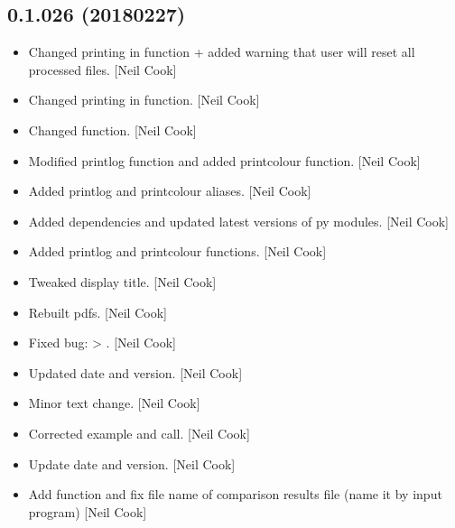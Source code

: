 \documentclass[a4paper,10pt,english]{report}
\begin{document}
\subsection{0.1.026 (2018\sphinxhyphen{}02\sphinxhyphen{}27)}
\label{\detokenize{misc/changelog:id497}}\begin{itemize}
\item {} 
Changed printing in function + added warning that user will reset all
processed files. {[}Neil Cook{]}

\item {} 
Changed printing in function. {[}Neil Cook{]}

\item {} 
Changed  function. {[}Neil Cook{]}

\item {} 
Modified printlog function and added printcolour function. {[}Neil Cook{]}

\item {} 
Added printlog and printcolour aliases. {[}Neil Cook{]}

\item {} 
Added dependencies and updated latest versions of py modules. {[}Neil
Cook{]}

\item {} 
Added printlog and printcolour functions. {[}Neil Cook{]}

\item {} 
Tweaked display title. {[}Neil Cook{]}

\item {} 
Rebuilt pdfs. {[}Neil Cook{]}

\item {} 
Fixed bug:  \sphinxhyphen{}\textgreater{} . {[}Neil Cook{]}

\item {} 
Updated date and version. {[}Neil Cook{]}

\item {} 
Minor text change. {[}Neil Cook{]}

\item {} 
Corrected  example and call. {[}Neil Cook{]}

\item {} 
Update date and version. {[}Neil Cook{]}

\item {} 
Add  function and fix file name of comparison results
file (name it by input program) {[}Neil Cook{]}


\end{itemize}
\end{document}
